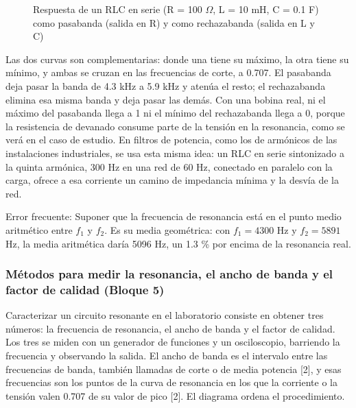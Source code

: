 \documentclass[11pt,letterpaper]{article}
\begin{document}
\begin{figure}[H]
  \caption{Respuesta de un RLC en serie (R = 100 \ensuremath{\Omega}, L = 10 mH, C = 0.1 \textmu{}F) como pasabanda (salida en R) y como rechazabanda (salida en L y C)}
\end{figure}

Las dos curvas son complementarias: donde una tiene su máximo, la otra tiene su mínimo, y ambas se cruzan en las frecuencias de corte, a 0.707. El pasabanda deja pasar la banda de 4.3 kHz a 5.9 kHz y atenúa el resto; el rechazabanda elimina esa misma banda y deja pasar las demás. Con una bobina real, ni el máximo del pasabanda llega a 1 ni el mínimo del rechazabanda llega a 0, porque la resistencia de devanado consume parte de la tensión en la resonancia, como se verá en el caso de estudio. En filtros de potencia, como los de armónicos de las instalaciones industriales, se usa esta misma idea: un RLC en serie sintonizado a la quinta armónica, 300 Hz en una red de 60 Hz, conectado en paralelo con la carga, ofrece a esa corriente un camino de impedancia mínima y la desvía de la red.

\begin{nota}{Error frecuente:}
Suponer que la frecuencia de resonancia está en el punto medio aritmético entre $f_1$ y $f_2$. Es su media geométrica: con $f_1 = 4300$ Hz y $f_2 = 5891$ Hz, la media aritmética daría 5096 Hz, un 1.3 \% por encima de la resonancia real.
\end{nota}

\subsubsection{Métodos para medir la resonancia, el ancho de banda y el factor de calidad (Bloque 5)}

Caracterizar un circuito resonante en el laboratorio consiste en obtener tres números: la frecuencia de resonancia, el ancho de banda y el factor de calidad. Los tres se miden con un generador de funciones y un osciloscopio, barriendo la frecuencia y observando la salida. El ancho de banda es el intervalo entre las frecuencias de banda, también llamadas de corte o de media potencia [2], y esas frecuencias son los puntos de la curva de resonancia en los que la corriente o la tensión valen 0.707 de su valor de pico [2]. El diagrama ordena el procedimiento.
\end{document}
